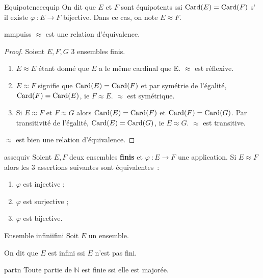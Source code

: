 \documentclass[a4paper,french]{memoir}
\begin{document}
\begin{defb}{Equipotence}{equip}
    On dit que $E$ et $F$ sont équipotents ssi $\operatorname{Card}(E) = \operatorname{Card}(F)$ s' il existe $\varphi~: E \to F$ bijective. Dans ce cas, on note $E \mathrel{\approx} F$. 
\end{defb}

\begin{theoremb}{}{mmpuiss}
    $ \mathrel{\approx}$ est une relation d'équivalence. 
\end{theoremb}

\begin{proof}
    Soient $E, F, G$ 3 ensembles finis.
	\begin{enumerate} 
		\item $E \mathrel{\approx} E$ étant donné que $E$ a le même cardinal que E. $\mathrel{\approx}$ est réflexive.
		\item $E \mathrel{\approx} F$ signifie que $ \operatorname{Card}(E) = \operatorname{Card}(F)$ et par symétrie de l'égalité, $\operatorname{Card}(F) = \operatorname{Card}(E)$, ie $F \mathrel{\approx} E$. $\mathrel{\approx}$ est symétrique. 
		\item Si $E \mathrel{\approx} F$ et $F \mathrel{\approx} G$ alors $\operatorname{Card}(E) = \operatorname{Card}(F)$ et $\operatorname{Card}(F) = \operatorname{Card}(G)$. Par transitivité de l'égalité, $\operatorname{Card}(E) = \operatorname{Card}(G)$, ie $E \mathrel{\approx} G$. $\mathrel{\approx}$ est transitive. 
	\end{enumerate}
	$\mathrel{\approx}$ est bien une relation d'équivalence.
\end{proof}

\begin{theoremb}{}{assequiv}
	Soient $E, F$ deux ensembles \textbf{finis} et $\varphi~: E \to F$ une application. Si $E \mathrel{\approx} F$ alors les 3 assertions suivantes sont équivalentes~:
	
	\begin{enumerate}
		\item $\varphi$ est injective ;
		\item $\varphi$ est surjective ;
		\item $\varphi$ est bijective. 
	\end{enumerate}
\end{theoremb}

\begin{defb}{Ensemble infini}{ifini}
	Soit $E$ un ensemble.
	
	On dit que $E$ est infini ssi $E$ n'est pas fini.
\end{defb}

\begin{theoremb}{}{partn} 
	Toute partie de $\mathbb{N}$ est finie ssi elle est majorée. 
\end{theoremb}
\end{document}
